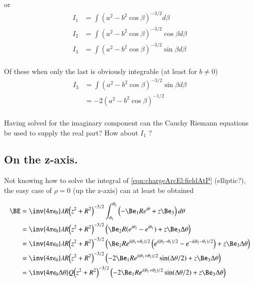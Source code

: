 or
\begin{align*}
I_1 &= \int { \left(a^2 - b^2\cos\beta\right) }^{-3/2} d\beta \\
I_2 &= \int { \left(a^2 - b^2\cos\beta\right) }^{-3/2} \cos\beta d\beta \\
I_3 &= \int { \left(a^2 - b^2\cos\beta\right) }^{-3/2} \sin\beta d\beta \\
\end{align*}

Of these when only the last is obviously integrable (at least for $b \ne 0$)
\begin{align*}
I_3
&= \int { \left(a^2 - b^2\cos\beta\right) }^{-3/2} \sin\beta d\beta \\
&= -2 {\left(a^2 - b^2\cos\beta\right) }^{-1/2} \\
\end{align*}

Having solved for the imaginary component can the Cauchy Riemann equations be used to supply the real part?  How about $I_1$ ?

\subsection{On the z-axis. }

Not knowing how to solve the integral of \ref{eqn:chargeArcEl:fieldAtP} (elliptic?), the easy case
of $\rho = 0$ (up the z-axis) can at least be obtained

\begin{align*}
\BE 
&= \inv{4 \pi \epsilon_0} \lambda R { \left(z^2 + R^2\right) }^{-3/2}
\int_{\theta_1}^{\theta_2} \left(-\Be_1 R e^{i\theta} + z \Be_3\right) d\theta \\
&= \inv{4 \pi \epsilon_0} \lambda R { \left(z^2 + R^2\right) }^{-3/2}
\left(\Be_2 R (e^{i\theta_2} -e^{i\theta_1}) + z \Be_3 \Delta\theta \right) \\
&= \inv{4 \pi \epsilon_0} \lambda R { \left(z^2 + R^2\right) }^{-3/2}
\left(\Be_2 R e^{i(\theta_1 + \theta_2)/2} \left(
e^{i(\theta_2 - \theta_1)/2}
-e^{-i(\theta_2 - \theta_1)/2}
\right) + z \Be_3 \Delta\theta \right) \\
&= \inv{4 \pi \epsilon_0} \lambda R { \left(z^2 + R^2\right) }^{-3/2}
\left(-2 \Be_1 R e^{i(\theta_1 + \theta_2)/2} \sin(\Delta\theta/2)
+ z \Be_3 \Delta\theta \right) \\
&= \inv{4 \pi \epsilon_0 \Delta\theta} Q { \left(z^2 + R^2\right) }^{-3/2}
\left(-2 \Be_1 R e^{i(\theta_1 + \theta_2)/2} \sin(\Delta\theta/2)
+ z \Be_3 \Delta\theta \right) \\
\end{align*}

